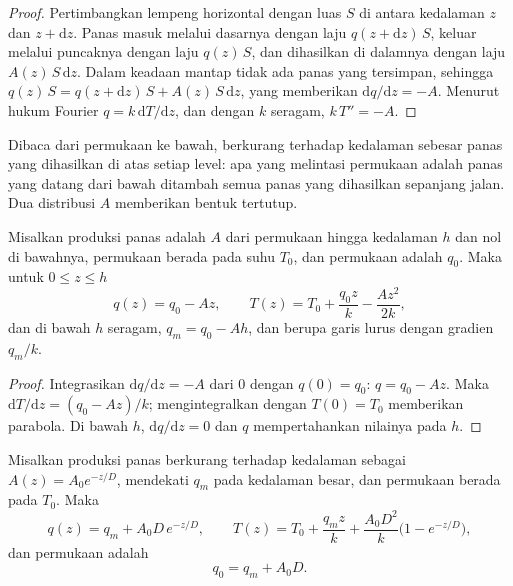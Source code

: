 \begin{proof}
Pertimbangkan lempeng horizontal dengan luas $S$ di antara kedalaman $z$ dan $z +
\mathrm dz$. Panas masuk melalui dasarnya dengan laju $q(z + \mathrm dz)\,S$,
keluar melalui puncaknya dengan laju $q(z)\,S$, dan dihasilkan di dalamnya dengan
laju $A(z)\,S\,\mathrm dz$. Dalam keadaan mantap tidak ada panas yang tersimpan, sehingga
$q(z)\,S = q(z + \mathrm dz)\,S + A(z)\,S\,\mathrm dz$, yang memberikan
$\mathrm dq/\mathrm dz = -A$. Menurut hukum Fourier $q = k\,\mathrm dT/\mathrm dz$,
dan dengan $k$ seragam, $k\,T'' = -A$.
\end{proof}

Dibaca dari permukaan ke bawah,  berkurang terhadap kedalaman sebesar panas yang dihasilkan di atas setiap level: apa yang melintasi permukaan adalah panas yang datang dari bawah ditambah semua panas yang dihasilkan sepanjang jalan. Dua distribusi $A$ memberikan bentuk tertutup.

\begin{proposition}\label{prop:b1:heat-budget:uniform}
Misalkan produksi panas adalah $A$ dari permukaan hingga kedalaman $h$ dan nol di bawahnya, permukaan berada pada suhu $T_0$, dan  permukaan adalah $q_0$.
Maka untuk $0 \le z \le h$
\[
  q(z) = q_0 - A z, \qquad T(z) = T_0 + \frac{q_0 z}{k} - \frac{A z^2}{2k},
\]
dan di bawah $h$  seragam, $q_m = q_0 - A h$, dan  berupa garis lurus dengan gradien $q_m/k$.
\end{proposition}

\begin{proof}
Integrasikan $\mathrm dq/\mathrm dz = -A$ dari $0$ dengan $q(0) = q_0$: $q = q_0 -
Az$. Maka $\mathrm dT/\mathrm dz = (q_0 - Az)/k$; mengintegralkan dengan $T(0) = T_0$
memberikan parabola. Di bawah $h$, $\mathrm dq/\mathrm dz = 0$ dan $q$ mempertahankan nilainya pada $h$.
\end{proof}

\begin{theorem}
\label{thm:b1:heat-budget:exponential}
Misalkan produksi panas berkurang terhadap kedalaman sebagai $A(z) = A_0 e^{-z/D}$,  mendekati $q_m$ pada kedalaman besar, dan permukaan berada pada $T_0$. Maka
\[
  q(z) = q_m + A_0 D\,e^{-z/D}, \qquad
  T(z) = T_0 + \frac{q_m z}{k} + \frac{A_0 D^2}{k}\bigl(1 - e^{-z/D}\bigr),
\]
dan  permukaan adalah
\[
  q_0 = q_m + A_0 D .
\]
\end{theorem}

